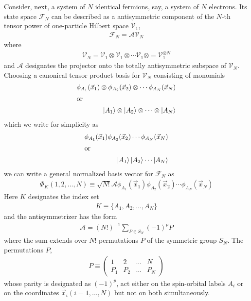 \documentclass{book}
\renewcommand{\ket}[1]{\Ket{#1}}
\begin{document}
Consider, next, a system of $N$ identical fermions, say, a system of $N$ electrons. Its state space $\mathcal{F}_N$ can be described as a antisymmetric component of the $N$-th tensor power of one-particle Hilbert space $\mathcal{V}_1$,
\begin{align}
    \mathcal{F}_N=\mathcal{A}\mathcal{V}_N
\end{align}
where
\begin{align}
    \mathcal{V}_N=\mathcal{V}_1\otimes\mathcal{V}_1\otimes\cdots\mathcal{V}_1\otimes=\mathcal{V}_1^{\otimes N}
\end{align}
and $\mathcal{A}$ designates the projector onto the totally antisymmetric subspace of $\mathcal{V}_N$. Choosing a canonical tensor product basis for $\mathcal{V}_N$ consisting of monomials
\begin{subequations}
    \begin{align}
        \phi_{A_1}(\vec{x}_1)\otimes\phi_{A_2}(\vec{x}_2)\otimes\cdots\phi_{A_N}(\vec{x}_N)\\
        \intertext{or}
        \ket{A_1}\otimes\ket{A_2}\otimes\cdots\otimes\ket{A_N}
    \end{align}
\end{subequations}
which we write for simplicity as 
\begin{subequations}
    \begin{align}
        \phi_{A_1}(\vec{x}_1)\phi_{A_2}(\vec{x}_2)\cdots\phi_{A_N}(\vec{x}_N)\\
        \intertext{or}
        \ket{A_1}\ket{A_2}\cdots\ket{A_N}
        \label{eq:9b}
    \end{align}
\end{subequations}
we can write a general normalized basis vector for $\mathcal{F}_N$ as 
\begin{align}
    \Phi_K(1,2,\ldots,N) \equiv \sqrt{N!} \mathcal{A}\phi_{A_1}(\vec{x}_1)\phi_{A_2}(\vec{x}_2)\cdots\phi_{A_N}(\vec{x}_N)
    \label{eq:10}
\end{align}
Here $K$ designates the index set 
\begin{align}
    K\equiv\{A_1,A_2,\ldots,A_N\}
\end{align}
and the antisymmetrizer has the  form
\begin{align}
    \mathcal{A}=(N!)^{-1}\sum_{P\in S_N}(-1)^{p}P
\end{align}
where the sum extends over $N!$ permutations $P$ of the symmetric group $S_N$. The permutations $P$, 
\begin{align}
    P \equiv
    \begin{pmatrix}
        1 & 2 & \ldots & N\\
        P_1&P_2&\ldots&P_N
    \end{pmatrix}
\end{align}
whose parity is designated as $(-1)^p$, act either on the spin-orbital labels $A_i$ or on the coordinates $\vec{x}_i (i=1,\ldots,N)$ but not on both simultaneously.
\end{document}
